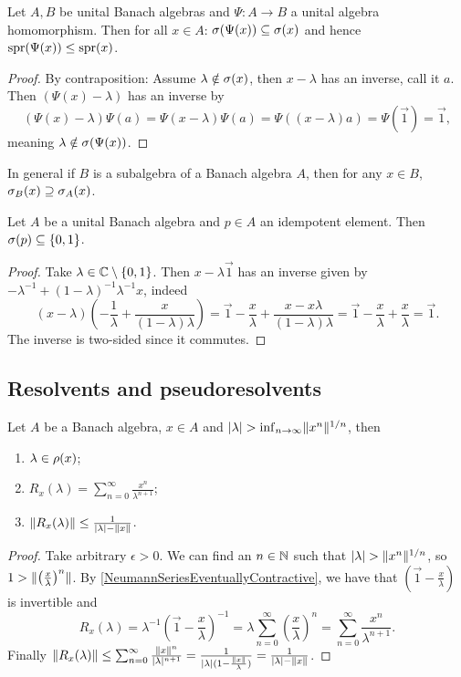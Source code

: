 \begin{lemma} \label{spectrumOfImage}
Let $A,B$ be unital Banach algebras and $\Psi: A\to B$ a unital algebra homomorphism. Then for all $x\in A$: $\sigma(\Psi(x)) \subseteq \sigma(x)$ and hence $\operatorname{spr}(\Psi(x)) \leq \operatorname{spr}(x)$.
\end{lemma}
\begin{proof}
By contraposition: Assume $\lambda\notin\sigma(x)$, then $x-\lambda$ has an inverse, call it $a$. Then $(\Psi(x) - \lambda)$ has an inverse by
\[ (\Psi(x) - \lambda)\Psi(a) = \Psi(x-\lambda)\Psi(a) = \Psi((x-\lambda)a) = \Psi(\vec{1}) = \vec{1},\]
meaning $\lambda \notin \sigma(\Psi(x))$.
\end{proof}

In general if $B$ is a subalgebra of a Banach algebra $A$, then for any $x\in B$, $\sigma_B(x) \supseteq \sigma_A(x)$.


\begin{lemma} \label{spectrumIdempotent}
Let $A$ be a unital Banach algebra and $p\in A$ an idempotent element. Then $\sigma(p) \subseteq \{0,1\}$.
\end{lemma}
\begin{proof}
Take $\lambda \in \mathbb{C}\setminus \{0,1\}$. Then $x-\lambda\vec{1}$ has an inverse given by $-\lambda^{-1} + (1 - \lambda)^{-1}\lambda^{-1}x$, indeed
\[ (x-\lambda)\left( - \frac{1}{\lambda} + \frac{x}{(1-\lambda)\lambda} \right) = \vec{1} - \frac{x}{\lambda} + \frac{x-x\lambda}{(1-\lambda)\lambda} =  \vec{1} - \frac{x}{\lambda} + \frac{x}{\lambda} = \vec{1}. \]
The inverse is two-sided since it commutes.
\end{proof}



\subsection{Resolvents and pseudoresolvents}

\begin{proposition} \label{secondNeumannSeries}
Let $A$ be a Banach algebra, $x\in A$ and $|\lambda| > \inf_{n\to \infty}\lVert x^n\rVert^{1/n}$, then
\begin{enumerate}
\item $\lambda\in\rho(x)$;
\item $R_x(\lambda) = \sum_{n=0}^\infty\frac{x^n}{\lambda^{n+1}}$;
\item $\lVert R_x(\lambda)\rVert \leq \frac{1}{|\lambda|-\lVert x\rVert}$.
\end{enumerate}
\end{proposition}
\begin{proof}
Take arbitrary $\epsilon > 0$. We can find an $n\in\mathbb{N}$ such that $|\lambda| > \lVert x^n\rVert^{1/n}$, so $1 > \lVert\left(\frac{x}{\lambda}\right)^n\rVert$. By \ref{NeumannSeriesEventuallyContractive}, we have that $(\vec{1} - \frac{x}{\lambda})$ is invertible and
\[ R_x(\lambda) = \lambda^{-1} \left(\vec{1} - \frac{x}{\lambda}\right)^{-1} = \lambda \sum_{n=0}^\infty\left(\frac{x}{\lambda}\right)^n = \sum_{n=0}^\infty\frac{x^n}{\lambda^{n+1}}. \]
Finally $\lVert R_x(\lambda)\rVert \leq \sum_{n=0}^\infty\frac{\lVert x\rVert^n}{|\lambda|^{n+1}} = \frac{1}{|\lambda|(1-\frac{\lVert x\rVert}{\lambda})} = \frac{1}{|\lambda|-\lVert x\rVert}$.
\end{proof}


